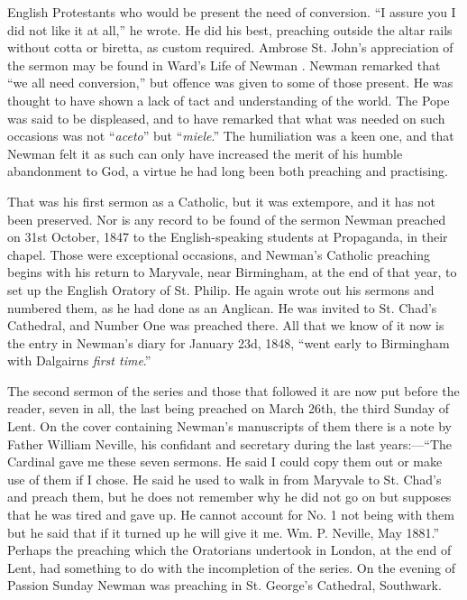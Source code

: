 English Protestants who would be present the need of conversion. ``I
assure you I did not like it at all,'' he wrote. He did his best,
preaching outside the altar rails without cotta or biretta, as custom
required. Ambrose St. John's appreciation of the sermon may be found
in Ward's Life of Newman .
Newman remarked that ``we all need conversion,'' but offence was given
to some of those present. He was thought to have shown a lack of tact
and understanding of the world. The Pope was said to be displeased,
and to have remarked that what was needed on such occasions was not
``\emph{aceto}'' but ``\emph{miele}.'' The humiliation was a
keen one, and that Newman felt it as such can only have increased the
merit of his humble abandonment to God, a virtue he had long been both
preaching and practising.


That was his first sermon as a Catholic, but it
was extempore, and it has not been preserved. Nor is any record to be
found of the sermon Newman preached on 31st October, 1847 to the
English-speaking students at Propaganda, in their chapel. Those were
exceptional occasions, and Newman's Catholic preaching begins with his
return to Maryvale, near Birmingham, at the end of that year, to set
up the English Oratory of St. Philip. He again wrote out his sermons
and numbered them, as he had done as an Anglican. He was invited
to St. Chad's Cathedral, and Number One was preached there. All that
we know of it now is the entry in Newman's diary for January 23d,
1848, ``went early to Birmingham with Dalgairns \emph{first time}.''


The second sermon of the series and those that
followed it are now put before the reader, seven in all, the last
being preached on March 26th, the third Sunday of Lent. On the cover
containing Newman's manuscripts of them there is a note by Father
William Neville, his confidant and secretary during the last
years:—``The Cardinal gave me these seven sermons. He said I
could copy them out or make use of them if I chose. He said he used to
walk in from Maryvale to St. Chad's and preach them, but he does not
remember why he did not go on but supposes that he was tired and gave
up. He cannot account for No. 1 not being with them but he said that
if it turned up he will give it me. Wm. P. Neville, May 1881.'' Perhaps
the preaching which the Oratorians undertook in London, at the end of
Lent, had something to do with the incompletion of the series. On the
evening of Passion Sunday Newman was preaching in St. George's
Cathedral, Southwark.


